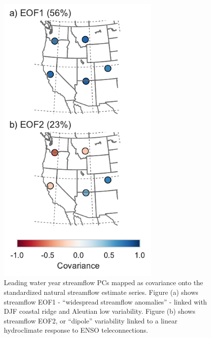 \documentclass[final, double]{ua-thesis}
\begin{document}
\begin{figure}[ht]
 \centerline{\includegraphics[width=19pc]{p2figures/fig_streamflow_eofs.pdf}}
  \caption{Leading water year streamflow PCs mapped as covariance onto the standardized natural streamflow estimate series. Figure (a) shows streamflow EOF1 - ``widespread streamflow anomalies'' - linked with DJF coastal ridge and Aleutian low variability. Figure (b) shows streamflow EOF2, or ``dipole'' variability linked to a linear hydroclimate response to ENSO teleconnections.}\label{fig_streamflow_eofs}
\end{figure}
\end{document}
